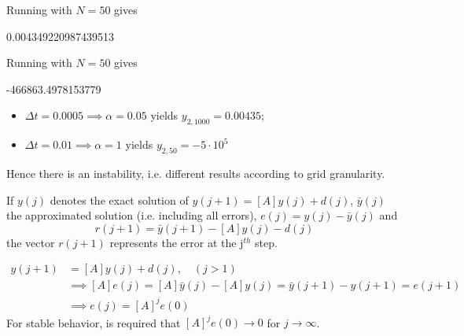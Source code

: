 \noindent
Running with $N=50$ gives
\begin{ioutput}
0.004349220987439513
\end{ioutput}
\noindent
Running with $N=50$ gives
\begin{ioutput}
-466863.4978153779
\end{ioutput}

\begin{itemize}
\item $\Delta t = 0.0005 \implies \alpha = 0.05$ yields $y_{2,1000}=0.00435$;
\item $\Delta t = 0.01 \implies \alpha = 1$ yields $y_{2,50}=-5\cdot 10^5$
\end{itemize}
Hence there is an instability, i.e. different results according to grid granularity.

If $y(j)$ denotes the exact solution of $y(j+1) = [A] y(j) + d(j)$, $\bar{y}(j)$ the approximated solution (i.e. including all errors), $e(j) = y(j)-\bar{y}(j)$ and
\begin{equation}
r(j+1) = \bar{y}(j+1) − [A]y(j) − d(j)
\end{equation}
\noindent
the vector $r(j+1)$ represents the error at the j$^{th}$ step. %

\begin{equation}
\begin{split}
y(j+1) &= [A]y(j) + d(j),\quad (j > 1) \\
&\implies [A]e(j) = [A]\bar{y}(j) − [A]y(j) = \bar{y}(j+1) − y(j+1) = e(j+1) \\
&\implies e(j) = [A]^j e(0)
\end{split}
\end{equation}
For stable behavior, is required that $[A]^j e(0) \rightarrow 0$ for $j\rightarrow\infty$.

